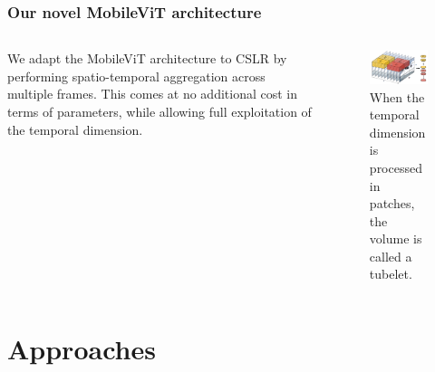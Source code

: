 \documentclass[english, xcolor={table}]{beamer}
\begin{document}
\begin{frame}
  \frametitle{Our novel MobileViT architecture}

  \begin{columns}
    \begin{column}{0.6\textwidth}
      We adapt the MobileViT architecture to CSLR by performing \alert{spatio-temporal} aggregation across \alert{multiple frames}. 
      This comes at no additional cost in terms of parameters, while allowing full exploitation of the temporal dimension.
    \end{column}
    \begin{column}{0.4\textwidth}
      \begin{figure}
        \centering
        \includegraphics[width=1\textwidth]{figures/tubelet.png}
        \caption{When the temporal dimension is processed in patches, the volume is called a \alert{tubelet}.}
      \end{figure}
    \end{column}
  \end{columns}
\end{frame}

\section{Approaches}
\end{document}
